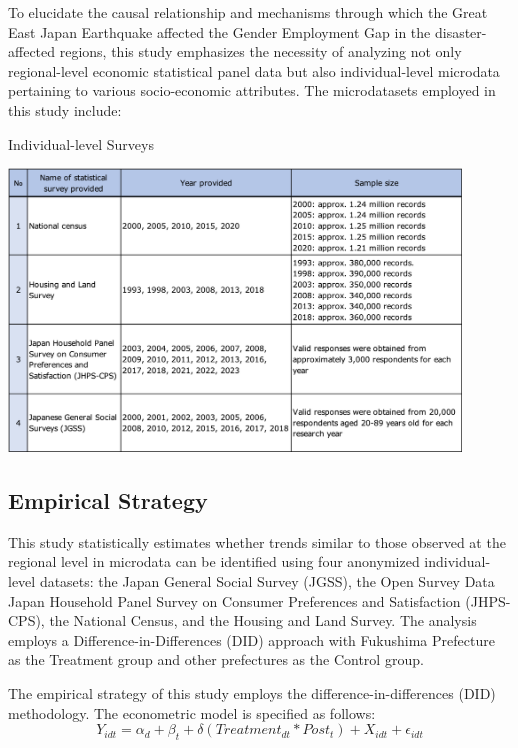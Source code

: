 \documentclass[12pt,halfline,a4paper]{ouparticle}
\begin{document}
To elucidate the causal relationship and mechanisms through which the Great East Japan Earthquake affected the Gender Employment Gap in the disaster-affected regions, this study emphasizes the necessity of analyzing not only regional-level economic statistical panel data but also individual-level microdata pertaining to various socio-economic attributes. The microdatasets employed in this study include:

\begin{table}[h]
    \centering
    \caption{Individual-level Surveys}
    \label{tab:annual_income}
    \includegraphics[width=0.9\textwidth]{Statistical surveys.png}  %
\end{table}

\newpage

\subsection{Empirical Strategy}
\label{sec5.1}

This study statistically estimates whether trends similar to those observed at the regional level in microdata can be identified using four anonymized individual-level datasets: the Japan General Social Survey (JGSS), the Open Survey Data Japan Household Panel Survey on Consumer Preferences and Satisfaction (JHPS-CPS), the National Census, and the Housing and Land Survey. The analysis employs a Difference-in-Differences (DID) approach with Fukushima Prefecture as the Treatment group and other prefectures as the Control group.

The empirical strategy of this study employs the difference-in-differences (DID) methodology. The econometric model is specified as follows:
\begin{equation}
Y_{idt} = \alpha_{d} + \beta_{t} + \delta (Treatment_{dt} * Post_{t}) + X_{idt} + \epsilon_{idt}
\end{equation}
\end{document}
